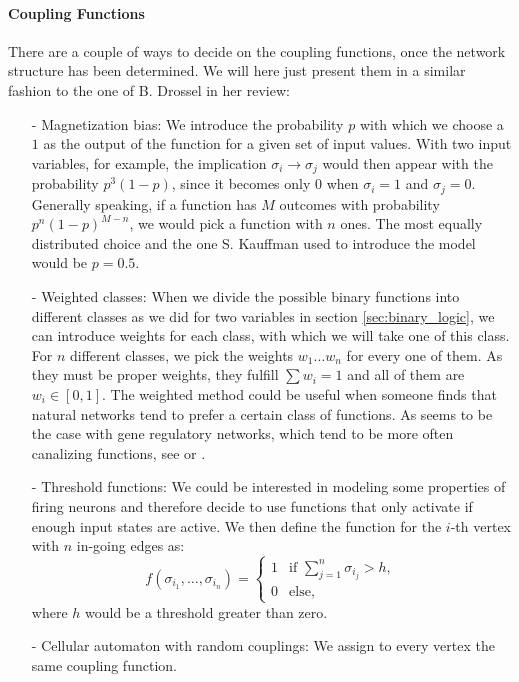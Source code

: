 \paragraph*{Coupling Functions}
There are a couple of ways to decide on the coupling functions, once the network structure has been determined. We will here just present them in a similar fashion to the one of B. Drossel \cite{drossel2008random} in her review:
\begin{itemize}
	\item[-] Magnetization bias: We introduce the probability $p$ with which we choose a $ 1 $ as the output of the function for a given set of input values. With two input variables, for example, the implication $\sigma_i \rightarrow \sigma_j$ would then appear with the probability $ p^3(1-p) $, since it becomes only $0$ when $\sigma_i = 1$ and $\sigma_j = 0$. Generally speaking, if a function has $M$ outcomes with probability $ p^n (1-p) ^{M-n} $, we would pick a function with $ n $ ones. The most equally distributed choice and the one S. Kauffman used to introduce the model would be $ p=0.5 $.
	\item[-] Weighted classes: When we divide the possible binary functions into different classes as we did for two variables in section \ref{sec:binary_logic}, we can introduce weights for each class, with which we will take one of this class. For $n$ different classes, we pick the weights $ w_1 \dots w_n $ for every one of them. As they must be proper weights, they fulfill $ \sum w_i =1 $ and all of them are $w_i \in [0,1]$. The weighted method could be useful when someone finds that natural networks tend to prefer a certain class of functions. As seems to be the case with gene regulatory networks, which tend to be more often canalizing functions, see \cite{harris2002model} or \cite{kauffman2003random}. 
\item[-] Threshold functions: We could be interested in modeling some properties of firing neurons and therefore decide to use functions that only activate if enough input states are active. We then define the function for the $i$-th vertex with $ n $ in-going edges as:
\begin{equation}
f(\sigma_{i_1},\dots , \sigma_{i_n}) = \begin{cases}
1 &\text{if } \sum\limits_{j=1}^{n}\sigma_{i_j}>h,\\
0 &\text{else},
\end{cases}
\end{equation}
	where $ h $ would be a threshold greater than zero.
	\item[-] Cellular automaton with random couplings: We assign to every vertex the same coupling function.
\end{itemize}

